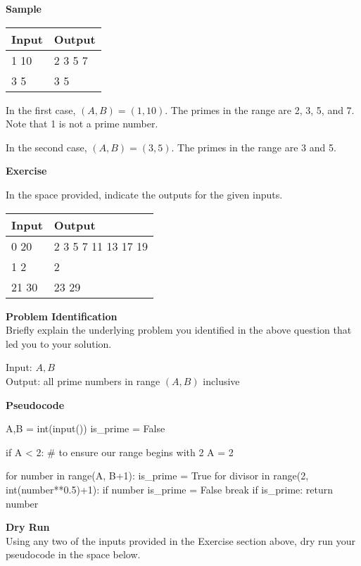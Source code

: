 \documentclass[a4paper]{exam}
\newcommand\heading[1]{\textbf{#1}}
\begin{document}
\begin{questions}
  \heading{Sample}

  \begin{tabularx}{\textwidth}{|X|X|}
    \rowcolor{gray!50}
    \hline
    Input & Output \\ \hline\hline
    1 10  & 2 3 5 7\\\hline
    3 5  & 3 5 \\\hline
  \end{tabularx}

  In the first case, $(A,B)=(1,10)$. The primes in the range are 2, 3, 5, and 7. Note that 1 is not a prime number.

  In the second case, $(A,B)=(3,5)$. The primes in the range are 3 and 5.

  \heading{Exercise}

  In the space provided, indicate the outputs for the given inputs.

  \begin{tabularx}{\textwidth}{|X|X|}
    \rowcolor{gray!50}
    \hline
    Input  & Output \\ \hline\hline
    0 20   &  2 3 5 7 11 13 17 19      \\\hline
    1 2 &  2      \\\hline
    21 30  & 23 29       \\\hline
  \end{tabularx}

  \heading{Problem Identification}\\
  Briefly explain the underlying problem you identified in the above question that led you to your solution.
  \begin{mdframed}
    Input: $A, B $\\
    Output: all prime numbers in range $(A,B)$ inclusive
  \end{mdframed}

  \heading{Pseudocode}
  \begin{python}
    A,B = int(input())
    is_prime = False
   
    if A < 2: # to ensure our range begins with 2
        A = 2
    
    for number in range(A, B+1):
        is_prime = True
        for divisor in range(2, int(number**0.5)+1): 
            if number %
                is_prime = False
                break
        if is_prime:
            return number
    \end{python}

  \heading{Dry Run}\\
  Using any two of the inputs provided in the Exercise section above, dry run your pseudocode in the space below.


\end{questions}
\end{document}
